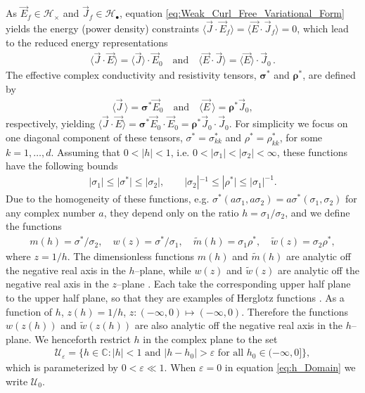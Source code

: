 \documentclass[english,12pt,jmp,graphicx]{revtex4-1}
\begin{document}
As $\vec{E}_f\in\mathscr{H}_\times$ and $\vec{J}_f\in\mathscr{H}_{\bullet}$, equation
\eqref{eq:Weak_Curl_Free_Variational_Form}
yields the energy (power density) constraints
$\langle\vec{J}\cdot\vec{E}_f\rangle=\langle\vec{E}\cdot\vec{J}_f\rangle=0$, which lead to the
reduced energy representations   
%
\begin{align}\label{eq:Reduced_System_Energy_Representations}
  \langle\vec{J}\cdot\vec{E}\rangle=\langle\vec{J}\rangle\cdot\vec{E}_0 \quad \text{and} \quad
  \langle\vec{E}\cdot\vec{J}\rangle=\langle\vec{E}\rangle\cdot\vec{J}_0\,.
\end{align}
%
The effective complex conductivity and resistivity tensors, $\bm{\sigma}^*$
and $\bm{\rho}^*$, are defined by  
%
\begin{align}\label{eq:eff_eps_def}
    \langle \vec{J} \,\rangle=  \bm{\sigma}^* \vec{E}_0 \quad \text{and} \quad
    \langle \vec{E} \,\rangle=  \bm{\rho}^*\vec{J}_0,
\end{align}
%
respectively, yielding
$\langle\vec{J}\cdot\vec{E}\rangle=\bm{\sigma}^*\vec{E}_0\cdot\vec{E}_0=\bm{\rho}^*\vec{J}_0\cdot\vec{J}_0$. For 
simplicity we focus on one diagonal component of 
these
tensors, $\sigma^*=\sigma^*_{kk}$ and $\rho^*=\rho^*_{kk}$, for some
$k=1,\ldots,d$. Assuming that $0<|h|<1$, i.e. $0<|\sigma_1|<|\sigma_2|<\infty$, these
functions have the following bounds
\cite{Torquato:RHM-02,MILTON:2002:TC}      
%
\begin{align}\label{eq:Elementary_Bounds}
  |\sigma_1\mid\leq|\sigma^*|\leq|\sigma_2|, \qquad |\sigma_2|^{-1}\leq|\rho^*|\leq|\sigma_1|^{-1}.
\end{align}
Due to the homogeneity of these functions, e.g. 
$\sigma^*(a\sigma_1,a\sigma_2)=a\sigma^*(\sigma_1,\sigma_2)$ for any complex number $a$,
they depend only on the ratio $h=\sigma_1/\sigma_2$, and we define the
functions  
%
\begin{align}
  m(h)=\sigma^*/\sigma_2, \quad w(z)=\sigma^*/\sigma_1, \quad \tilde{m}(h)=\sigma_1\rho^*,
  \quad \tilde{w}(z)=\sigma_2\rho^*,
\end{align}
%
where $z=1/h$. The dimensionless functions $m(h)$ and
$\tilde{m}(h)$ are analytic off the negative real axis in the
$h$--plane, while $w(z)$ and $\tilde{w}(z)$ are analytic off the
negative real axis in the $z$--plane \cite{Golden:CMP-473}. Each take
the corresponding upper half plane to the upper half plane, so that
they are examples of Herglotz functions \cite{Golden:CMP-473}.
As a function of $h$, $z(h)=1/h$, $z:(-\infty,0)\mapsto(-\infty,0)$. Therefore the
functions $w(z(h))$ and $\tilde{w}(z(h))$ are also analytic off the
negative real axis in the $h$--plane. We henceforth restrict $h$ in
the complex plane to the set   
%
\begin{align}\label{eq:h_Domain}
  \mathcal{U}_\varepsilon=\{h\in\mathbb{C}: |h|<1 \text{ and } |h-h_0|>\varepsilon
  \text{ for all } h_0\in(-\infty,0]\},
\end{align}
%
which is parameterized by $0<\varepsilon\ll1$. When $\varepsilon=0$ in equation
\eqref{eq:h_Domain} we write $\mathcal{U}_0$.
\end{document}

